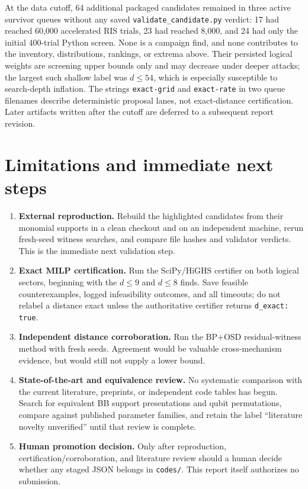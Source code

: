 \documentclass[11pt]{article}
\newcommand{\pathcode}[1]{\nolinkurl{#1}}
\begin{document}
At the data cutoff, 64 additional packaged candidates remained in three
active survivor queues without any saved
\pathcode{validate_candidate.py} verdict: 17 had reached 60,000 accelerated
RIS trials, 23 had reached 8,000, and 24 had only the initial 400-trial Python
screen.  None is a campaign find, and none contributes to the inventory,
distributions, rankings, or extrema above.  Their persisted logical weights
are screening upper bounds only and may decrease under deeper attacks; the
largest such shallow label was $d\leq54$, which is especially susceptible to
search-depth inflation.  The strings \pathcode{exact-grid} and
\pathcode{exact-rate} in two queue filenames describe deterministic proposal
lanes, not exact-distance certification.  Later artifacts written after the
cutoff are deferred to a subsequent report revision.

\enlargethispage{\baselineskip}
\section{Limitations and immediate next steps}

\begin{enumerate}
  \item \textbf{External reproduction.}  Rebuild the highlighted candidates
  from their monomial supports in a clean checkout and on an independent
  machine, rerun fresh-seed witness searches, and compare file hashes and
  validator verdicts.  This is the immediate next validation step.

  \item \textbf{Exact MILP certification.}  Run the SciPy/HiGHS certifier on
  both logical sectors, beginning with the $d\leq9$ and $d\leq8$ finds.  Save
  feasible counterexamples, logged infeasibility outcomes, and all timeouts;
  do not relabel a distance exact unless
  the authoritative certifier returns \pathcode{d_exact: true}.

  \item \textbf{Independent distance corroboration.}  Run the BP+OSD
  residual-witness method with fresh seeds.  Agreement would be valuable
  cross-mechanism evidence, but would still not supply a lower bound.

  \item \textbf{State-of-the-art and equivalence review.}  No systematic
  comparison with the current literature, preprints, or independent code
  tables has begun.  Search for equivalent BB support presentations and
  qubit permutations, compare against published parameter families, and
  retain the label ``literature novelty unverified'' until that review is
  complete.

  \item \textbf{Human promotion decision.}  Only after reproduction,
  certification/corroboration, and literature review should a human decide
  whether any staged JSON belongs in \pathcode{codes/}.  This report itself
  authorizes no submission.
\end{enumerate}
\end{document}
